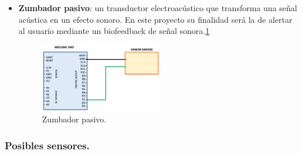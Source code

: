\begin{itemize}
\item \textbf{Zumbador pasivo}: un transductor electroacústico que transforma una señal acústica en un efecto sonoro. En este proyecto su finalidad será la de alertar al usuario mediante un biofeedback de señal sonora.\ref{fig:zumbador}
\begin{figure}[h!]
    \centering
    \includegraphics[width=0.5\textwidth]{img/SW520D.png}
    \caption{Zumbador pasivo.}
    \label{fig:zumbador} %
\end{figure}


\end{itemize}


\subsubsection{Posibles sensores.}

